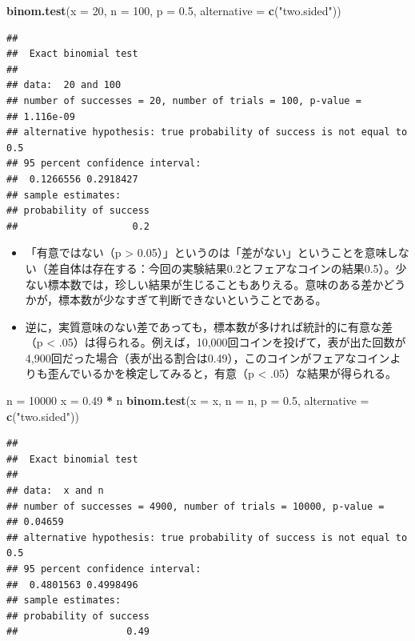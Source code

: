 \documentclass[]{article}
\newenvironment{Shaded}{\begin{snugshade}}{\end{snugshade}}
\newcommand{\KeywordTok}[1]{\textcolor[rgb]{0.13,0.29,0.53}{\textbf{#1}}}
\newcommand{\DataTypeTok}[1]{\textcolor[rgb]{0.13,0.29,0.53}{#1}}
\newcommand{\DecValTok}[1]{\textcolor[rgb]{0.00,0.00,0.81}{#1}}
\newcommand{\FloatTok}[1]{\textcolor[rgb]{0.00,0.00,0.81}{#1}}
\newcommand{\StringTok}[1]{\textcolor[rgb]{0.31,0.60,0.02}{#1}}
\newcommand{\OperatorTok}[1]{\textcolor[rgb]{0.81,0.36,0.00}{\textbf{#1}}}
\newcommand{\NormalTok}[1]{#1}
\begin{document}
\begin{Shaded}
\begin{Highlighting}[]
\KeywordTok{binom.test}\NormalTok{(}\DataTypeTok{x =} \DecValTok{20}\NormalTok{, }\DataTypeTok{n =} \DecValTok{100}\NormalTok{, }\DataTypeTok{p =} \FloatTok{0.5}\NormalTok{, }\DataTypeTok{alternative =} \KeywordTok{c}\NormalTok{(}\StringTok{"two.sided"}\NormalTok{))}
\end{Highlighting}
\end{Shaded}

\begin{verbatim}
## 
##  Exact binomial test
## 
## data:  20 and 100
## number of successes = 20, number of trials = 100, p-value =
## 1.116e-09
## alternative hypothesis: true probability of success is not equal to 0.5
## 95 percent confidence interval:
##  0.1266556 0.2918427
## sample estimates:
## probability of success 
##                    0.2
\end{verbatim}

\begin{itemize}
\item
  「有意ではない（p \textgreater{}
  0.05）」というのは「差がない」ということを意味しない（差自体は存在する：今回の実験結果0.2とフェアなコインの結果0.5）。少ない標本数では，珍しい結果が生じることもありえる。意味のある差かどうかが，標本数が少なすぎて判断できないということである。
\item
  逆に，実質意味のない差であっても，標本数が多ければ統計的に有意な差（p
  \textless{}
  .05）は得られる。例えば，10,000回コインを投げて，表が出た回数が4,900回だった場合（表が出る割合は0.49），このコインがフェアなコインよりも歪んでいるかを検定してみると，有意（p
  \textless{} .05）な結果が得られる。
\end{itemize}

\begin{Shaded}
\begin{Highlighting}[]
\NormalTok{n =}\StringTok{ }\DecValTok{10000}
\NormalTok{x =}\StringTok{ }\FloatTok{0.49} \OperatorTok{*}\StringTok{ }\NormalTok{n}
\KeywordTok{binom.test}\NormalTok{(}\DataTypeTok{x =}\NormalTok{ x, }\DataTypeTok{n =}\NormalTok{ n, }\DataTypeTok{p =} \FloatTok{0.5}\NormalTok{, }\DataTypeTok{alternative =} \KeywordTok{c}\NormalTok{(}\StringTok{"two.sided"}\NormalTok{))}
\end{Highlighting}
\end{Shaded}

\begin{verbatim}
## 
##  Exact binomial test
## 
## data:  x and n
## number of successes = 4900, number of trials = 10000, p-value =
## 0.04659
## alternative hypothesis: true probability of success is not equal to 0.5
## 95 percent confidence interval:
##  0.4801563 0.4998496
## sample estimates:
## probability of success 
##                   0.49
\end{verbatim}
\end{document}
